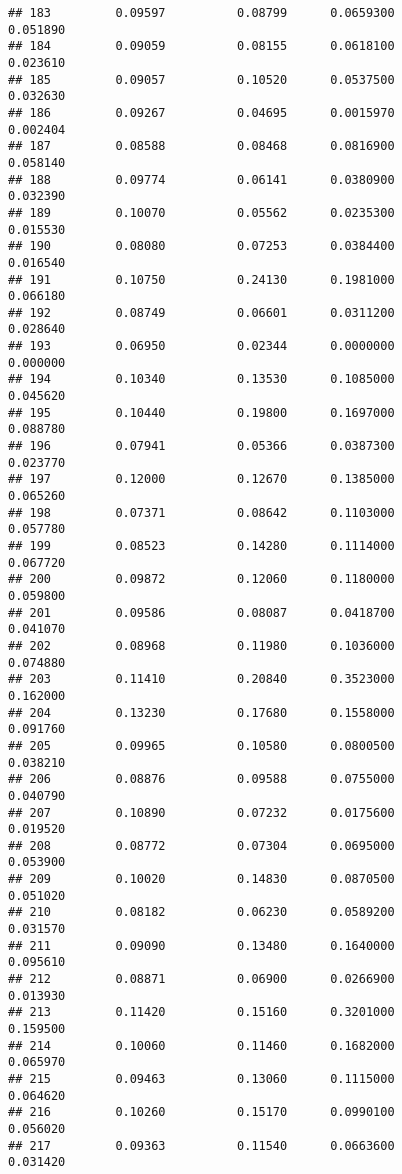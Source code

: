 \documentclass[
]{article}
\begin{document}
\begin{verbatim}
## 183         0.09597          0.08799      0.0659300            0.051890
## 184         0.09059          0.08155      0.0618100            0.023610
## 185         0.09057          0.10520      0.0537500            0.032630
## 186         0.09267          0.04695      0.0015970            0.002404
## 187         0.08588          0.08468      0.0816900            0.058140
## 188         0.09774          0.06141      0.0380900            0.032390
## 189         0.10070          0.05562      0.0235300            0.015530
## 190         0.08080          0.07253      0.0384400            0.016540
## 191         0.10750          0.24130      0.1981000            0.066180
## 192         0.08749          0.06601      0.0311200            0.028640
## 193         0.06950          0.02344      0.0000000            0.000000
## 194         0.10340          0.13530      0.1085000            0.045620
## 195         0.10440          0.19800      0.1697000            0.088780
## 196         0.07941          0.05366      0.0387300            0.023770
## 197         0.12000          0.12670      0.1385000            0.065260
## 198         0.07371          0.08642      0.1103000            0.057780
## 199         0.08523          0.14280      0.1114000            0.067720
## 200         0.09872          0.12060      0.1180000            0.059800
## 201         0.09586          0.08087      0.0418700            0.041070
## 202         0.08968          0.11980      0.1036000            0.074880
## 203         0.11410          0.20840      0.3523000            0.162000
## 204         0.13230          0.17680      0.1558000            0.091760
## 205         0.09965          0.10580      0.0800500            0.038210
## 206         0.08876          0.09588      0.0755000            0.040790
## 207         0.10890          0.07232      0.0175600            0.019520
## 208         0.08772          0.07304      0.0695000            0.053900
## 209         0.10020          0.14830      0.0870500            0.051020
## 210         0.08182          0.06230      0.0589200            0.031570
## 211         0.09090          0.13480      0.1640000            0.095610
## 212         0.08871          0.06900      0.0266900            0.013930
## 213         0.11420          0.15160      0.3201000            0.159500
## 214         0.10060          0.11460      0.1682000            0.065970
## 215         0.09463          0.13060      0.1115000            0.064620
## 216         0.10260          0.15170      0.0990100            0.056020
## 217         0.09363          0.11540      0.0663600            0.031420

\end{verbatim}
\end{document}
